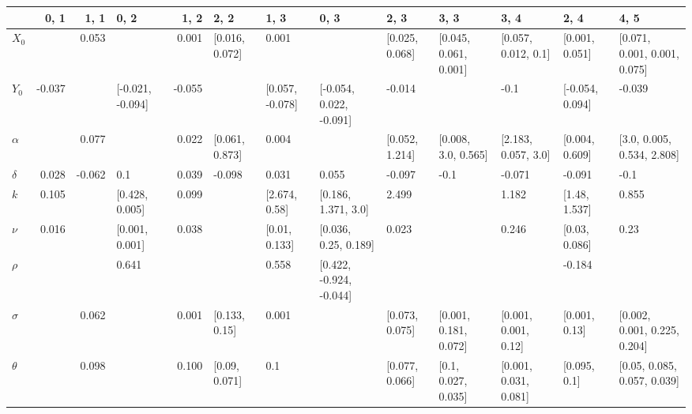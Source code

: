 \begin{table}[H]
\begin{adjustbox}{width=\textwidth}
		\begin{tabular}{lrrlrllllllll}
			\toprule
			{} &   0, 1 &   1, 1 &              0, 2 &   1, 2 &            2, 2 &             1, 3 &                     0, 3 &            2, 3 &                   3, 3 &                   3, 4 &             2, 4 &                          4, 5 \\
			\midrule
			$X_0$   &        &  0.053 &                   &  0.001 &  [0.016, 0.072] &            0.001 &                          &  [0.025, 0.068] &  [0.045, 0.061, 0.001] &    [0.057, 0.012, 0.1] &   [0.001, 0.051] &  [0.071, 0.001, 0.001, 0.075] \\
			$Y_0$   & -0.037 &        &  [-0.021, -0.094] & -0.055 &                 &  [0.057, -0.078] &  [-0.054, 0.022, -0.091] &          -0.014 &                        &                   -0.1 &  [-0.054, 0.094] &                        -0.039 \\
			$\alpha$ &        &  0.077 &                   &  0.022 &  [0.061, 0.873] &            0.004 &                          &  [0.052, 1.214] &    [0.008, 3.0, 0.565] &    [2.183, 0.057, 3.0] &   [0.004, 0.609] &    [3.0, 0.005, 0.534, 2.808] \\
			$\delta$ &  0.028 & -0.062 &               0.1 &  0.039 &          -0.098 &            0.031 &                    0.055 &          -0.097 &                   -0.1 &                 -0.071 &           -0.091 &                          -0.1 \\
			$k$     &  0.105 &        &    [0.428, 0.005] &  0.099 &                 &    [2.674, 0.58] &      [0.186, 1.371, 3.0] &           2.499 &                        &                  1.182 &    [1.48, 1.537] &                         0.855 \\
			$\nu$    &  0.016 &        &    [0.001, 0.001] &  0.038 &                 &    [0.01, 0.133] &     [0.036, 0.25, 0.189] &           0.023 &                        &                  0.246 &    [0.03, 0.086] &                          0.23 \\
			$\rho$   &        &        &             0.641 &        &                 &            0.558 &  [0.422, -0.924, -0.044] &                 &                        &                        &           -0.184 &                               \\
			$\sigma$ &        &  0.062 &                   &  0.001 &   [0.133, 0.15] &            0.001 &                          &  [0.073, 0.075] &  [0.001, 0.181, 0.072] &   [0.001, 0.001, 0.12] &    [0.001, 0.13] &  [0.002, 0.001, 0.225, 0.204] \\
			$\theta$ &        &  0.098 &                   &  0.100 &   [0.09, 0.071] &              0.1 &                          &  [0.077, 0.066] &    [0.1, 0.027, 0.035] &  [0.001, 0.031, 0.081] &     [0.095, 0.1] &   [0.05, 0.085, 0.057, 0.039] \\
			\bottomrule
		\end{tabular}
		
	\end{adjustbox}
	
\end{table}

